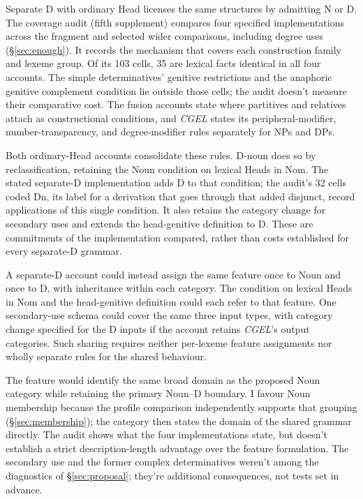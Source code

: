 \documentclass[12pt]{article}
\begin{document}
Separate D with ordinary Head licenses the same structures by admitting N or D. The coverage audit (fifth supplement) compares four specified implementations across the fragment and selected wider comparisons, including degree uses (§\ref{sec:enough}). It records the mechanism that covers each construction family and lexeme group. Of its 103 cells, 35 are lexical facts identical in all four accounts. The simple determinatives' genitive restrictions and the anaphoric genitive complement condition lie outside those cells; the audit doesn't measure their comparative cost. The fusion accounts state where partitives and relatives attach as constructional conditions, and \textit{CGEL} states its peripheral-modifier, number-transparency, and degree-modifier rules separately for NPs and DPs.

Both ordinary-Head accounts consolidate these rules. D-noun does so by reclassification, retaining the Noun condition on lexical Heads in Nom. The stated separate-D implementation adds D to that condition; the audit's 32 cells coded Dn, its label for a derivation that goes through that added disjunct, record applications of this single condition. It also retains the category change for secondary uses and extends the head-genitive definition to D. These are commitments of the implementation compared, rather than costs established for every separate-D grammar.

A separate-D account could instead assign the same feature once to Noun and once to D, with inheritance within each category. The condition on lexical Heads in Nom and the head-genitive definition could each refer to that feature. One secondary-use schema could cover the same three input types, with category change specified for the D inputs if the account retains \textit{CGEL}'s output categories. Such sharing requires neither per-lexeme feature assignments nor wholly separate rules for the shared behaviour.

The feature would identify the same broad domain as the proposed Noun category while retaining the primary Noun--D boundary. I favour Noun membership because the profile comparison independently supports that grouping (§\ref{sec:membership}); the category then states the domain of the shared grammar directly. The audit shows what the four implementations state, but doesn't establish a strict description-length advantage over the feature formulation. The secondary use and the former complex determinatives weren't among the diagnostics of §\ref{sec:proposal}; they're additional consequences, not tests set in advance.
\end{document}
